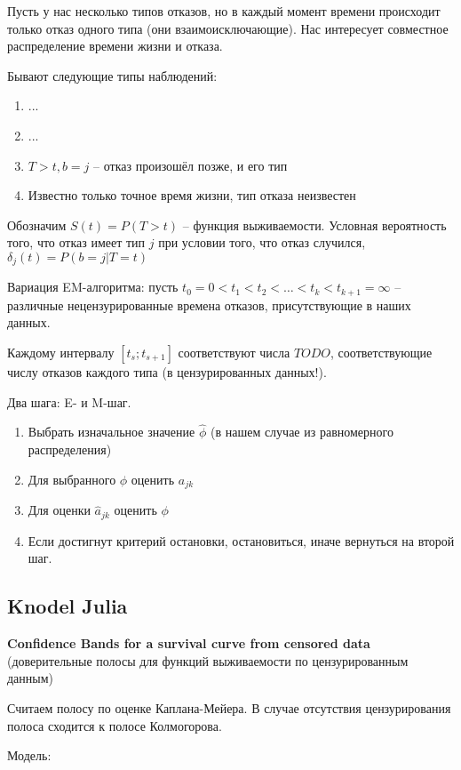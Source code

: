 \documentclass[main.tex]{subfiles}
\begin{document}
	Пусть у нас несколько типов отказов, но в каждый момент времени происходит только отказ одного типа (они взаимоисключающие).
	Нас интересует совместное распределение времени жизни и отказа.
	
	Бывают следующие типы наблюдений:
	\begin{enumerate}
		\item ...
		\item ...
		\item $ { T > t, b = j } $ -- отказ произошёл позже, и его тип 
		\item Известно только точное время жизни, тип отказа неизвестен
	\end{enumerate}

Обозначим $ S(t) = P(T > t) $ -- функция выживаемости.
Условная вероятность того, что отказ имеет тип $ j $ при условии того, что отказ случился, $ \delta_j(t) = P(b=j | T=t) $

Вариация EM-алгоритма:
пусть $ t_0 = 0 < t_1 < t_2 < \dots < t_k < t_{k+1} = \infty $ -- различные нецензурированные времена отказов, присутствующие в наших данных.

Каждому интервалу $ [t_s; t_{s+1}] $ соответствуют числа $ TODO $, соответствующие числу отказов каждого типа (в цензурированных данных!).

Два шага: E- и M-шаг.

\begin{enumerate}[noitemsep]
	\item Выбрать изначальное значение $ \hat \phi $ (в нашем случае из равномерного распределения)
	\item Для выбранного $ \hat \phi $ оценить $ a_{jk} $
	\item Для оценки $ \hat a_{jk} $ оценить $ \phi $
	\item Если достигнут критерий остановки, остановиться, иначе вернуться на второй шаг.  
\end{enumerate}

\subsection{Knodel Julia}

\textbf{Confidence Bands for a survival curve from censored data}
(доверительные полосы для функций выживаемости по цензурированным данным)

Считаем полосу по оценке Каплана-Мейера.
В случае отсутствия цензурирования полоса сходится к полосе Колмогорова.

Модель:
\end{document}
